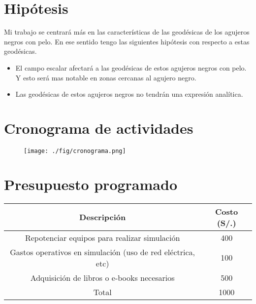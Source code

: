 \documentclass[../Main.tex]{subfiles}
\begin{document}
\section{Hipótesis}
Mi trabajo se centrará más en las características de las geodésicas de los agujeros negros con pelo. En ese sentido tengo las siguientes hipótesis con respecto a estas geodésicas.

\begin{itemize}
    \item El campo escalar afectará a las geodésicas de estos agujeros negros con pelo. Y esto será mas notable en zonas cercanas al agujero negro.
    \item Las geodésicas de estos agujeros negros no tendrán una expresión analítica.
\end{itemize}

\newpage
\section{Cronograma de actividades}

\begin{figure}[ht]
    \centering
    \texttt{[image: ./fig/cronograma.png]}
\end{figure}

\section{Presupuesto programado}

\begin{table}[ht]
    \centering
    \begin{tabular}{| c | c |}
        \hline
        Descripción & Costo (S/.) \\
        \hline
        Repotenciar equipos para realizar simulación & 400 \\
        \hline
        Gastos operativos en simulación (uso de red eléctrica, etc) & 100 \\
        \hline
        Adquisición de libros o e-books necesarios & 500 \\
        \hline
        Total & 1000 \\
        \hline
    \end{tabular}
\end{table}


\biblio %
\end{document}
